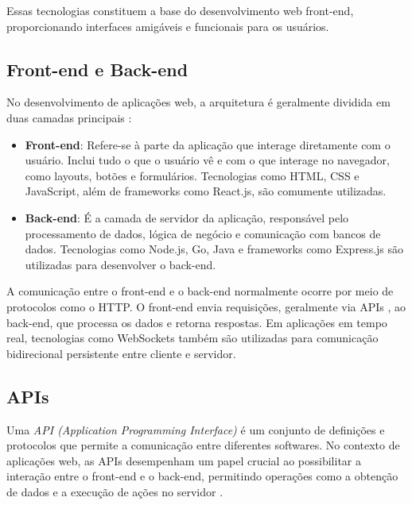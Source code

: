Essas tecnologias constituem a base do desenvolvimento web front-end, proporcionando interfaces amigáveis e funcionais para os usuários.

\subsection{Front-end e Back-end}


No desenvolvimento de aplicações web, a arquitetura é geralmente dividida em duas camadas principais \cite{web-app}:

\begin{itemize}
    \item \textbf{Front-end}: Refere-se à parte da aplicação que interage diretamente com o usuário. Inclui tudo o que o usuário vê e com o que interage no navegador, como layouts, botões e formulários. Tecnologias como HTML, CSS e JavaScript, além de frameworks como React.js, são comumente utilizadas.
    \item \textbf{Back-end}: É a camada de servidor da aplicação, responsável pelo processamento de dados, lógica de negócio e comunicação com bancos de dados. Tecnologias como Node.js, Go, Java e frameworks como Express.js são utilizadas para desenvolver o back-end.
\end{itemize}

A comunicação entre o front-end e o back-end normalmente ocorre por meio de protocolos como o HTTP. O front-end envia requisições, geralmente via APIs \cite{web-app}, ao back-end, que processa os dados e retorna respostas. Em aplicações em tempo real, tecnologias como WebSockets também são utilizadas para comunicação bidirecional \cite{ws-standard} persistente entre cliente e servidor.

\subsection{APIs}


Uma \emph{API (Application Programming Interface)} é um conjunto de definições e protocolos que permite a comunicação entre diferentes softwares. No contexto de aplicações web, as APIs desempenham um papel crucial ao possibilitar a interação entre o front-end e o back-end, permitindo operações como a obtenção de dados e a execução de ações no servidor \cite{aws-api-types}.

